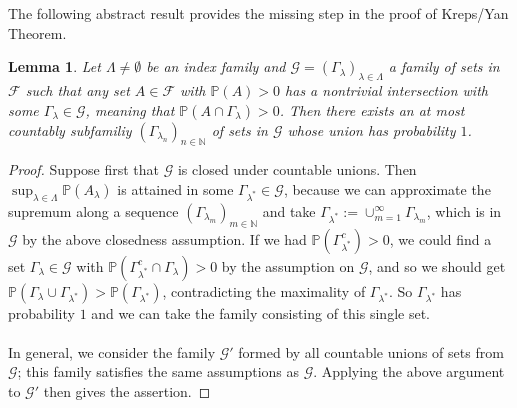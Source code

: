\documentclass[12pt,a4paper, twoside]{article}
\newtheorem{lem}{Lemma}[section]
\theoremstyle{definition}
\newcommand{\PP}{\mathbb{P}} %
\begin{document}
\newpage
The following abstract result provides the missing step in the proof of Kreps/Yan Theorem.
\begin{lem} Let $\Lambda \neq \emptyset$ be an index family and $\mathcal{G}= ( \Gamma_\lambda)_{ \lambda \in \Lambda}$ a family of sets in $\mathcal{F}$ such that any set $A \in \mathcal{F}$ with $\PP(A) >0$ has a nontrivial intersection with some $\Gamma_\lambda \in \mathcal{G}$, meaning that $\PP(A \cap \Gamma_\lambda)>0$. Then there exists an at most countably subfamiliy $( \Gamma_{ \lambda_n})_{n \in \mathbb{N}}$ of sets in $\mathcal{G}$ whose union has probability $1$. 
\end{lem}
\begin{proof}
Suppose first that $\mathcal{G}$ is closed under countable unions. Then $\sup_{ \lambda \in \Lambda} \PP(A_\lambda)$ is attained in some $\Gamma_{\lambda^*} \in \mathcal{G}$, because we can approximate the supremum along a sequence $( \Gamma_{\lambda_m})_{m \in \mathbb{N}}$ and take $\Gamma_{ \lambda^*} := \cup_{m=1}^\infty \Gamma_{ \lambda_m}$, which is in $\mathcal{G}$ by the above closedness assumption. If we had $\PP( \Gamma_{ \lambda^*}^c) >0$, we could find a set $\Gamma_\lambda \in \mathcal{G}$ with $\PP( \Gamma_{ \lambda^*}^c \cap \Gamma_\lambda) >0$ by the assumption on $\mathcal{G}$, and so we should get $\PP( \Gamma_\lambda \cup \Gamma_{\lambda^*}) > \PP( \Gamma_{\lambda^*})$,  contradicting the maximality of $\Gamma_{\lambda^*}$. So $\Gamma_{\lambda^*}$ has probability $1$ and we can take the family consisting of this single set.
\\
\\
In general, we consider the family $\mathcal{G}'$ formed by all countable unions of sets from $\mathcal{G}$; this family satisfies the same assumptions as $\mathcal{G}$. Applying the above argument to $\mathcal{G}'$ then gives the assertion. 
\end{proof}
\newpage
\end{document}
